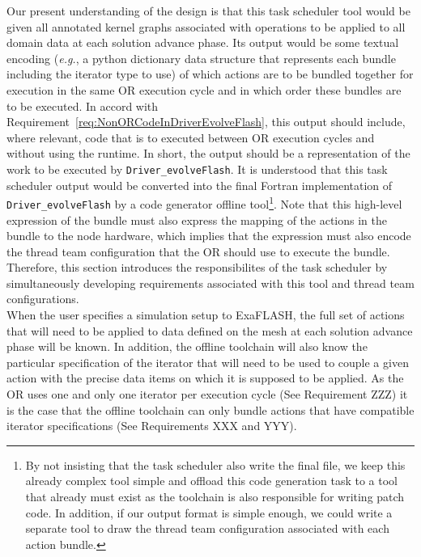 \documentclass{article}
\newcommand{\code}[1]{{\tt#1}}
\newcommand{\FlashOfTheFuture}{ExaFLASH\xspace}
\newcommand{\eg}{\textit{e.g.}}   %
\newcommand{\shortOR}   {OR\xspace}
\newcommand{\OR}        {\shortOR}
\begin{document}
Our present understanding of the design is that this task scheduler tool would
be given all annotated kernel graphs associated with operations to be applied to
all domain data at each solution advance phase.  Its output would be some
textual encoding (\eg, a python dictionary data structure that represents each
bundle including the iterator type to use) of which actions are to be bundled
together for execution in the same \OR execution cycle and in which order these
bundles are to be executed.  In accord with
Requirement~\ref{req:NonORCodeInDriverEvolveFlash}, this output should include,
where relevant, code that is to executed between \OR execution cycles and without using
the runtime.  In short, the output should be a representation of the work to be
executed by \code{Driver\_evolveFlash}.  It is understood that this task
scheduler output would be converted into the final Fortran implementation of
\code{Driver\_evolveFlash} by a code generator offline tool\footnote{By not
insisting that the task scheduler also write the final file, we keep this
already complex tool simple and offload this code generation task to a tool that
already must exist as the toolchain is also responsible for writing patch code.
In addition, if our output format is simple enough, we could write a separate
tool to draw the thread team configuration associated with each action bundle.}.
Note that this high-level expression of the bundle must also express the mapping
of the actions in the bundle to the node hardware, which implies that the
expression must also encode the thread team configuration that the \OR should
use to execute the bundle.  Therefore, this section introduces the
responsibilites of the task scheduler by simultaneously developing requirements
associated with this tool and thread team configurations.\\

When the user specifies a simulation setup to \FlashOfTheFuture, the full set of
actions that will need to be applied to data defined on the mesh at each
solution advance phase will be known.  In addition, the offline toolchain will
also know the particular specification of the iterator that will need to be
used to couple a given action with the precise data items on which it is supposed to be
applied.  As the \OR uses one and only one iterator per execution cycle (See
Requirement ZZZ) it is the case that the offline toolchain can only bundle
actions that have compatible iterator specifications (See Requirements XXX and
YYY).\\
\end{document}
